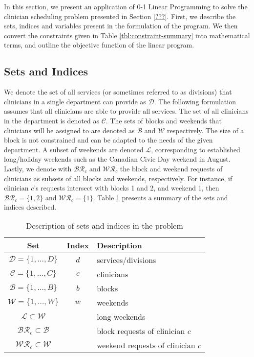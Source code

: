 In this section, we present an application of 0-1 Linear Programming to solve the clinician scheduling problem presented in Section \ref{???}. First, we describe the sets, indices and variables present in the formulation of the program. We then convert the constraints given in Table \ref{tbl:constraint-summary} into mathematical terms, and outline the objective function of the linear program.

\subsection{Sets and Indices}
We denote the set of all services (or sometimes referred to as divisions) %
that clinicians in a single department can provide as $\mathcal{D}$. The following formulation assumes that all clinicians are able to provide all services. The set of all clinicians in the department is denoted as $\mathcal{C}$. The sets of blocks and weekends that clinicians will be assigned to are denoted as $\mathcal{B}$ and $\mathcal{W}$ respectively. The size of a block is not constrained and can be adapted %
to the needs of the given department. A subset of weekends are denoted $\mathcal{L}$, corresponding to established long/holiday weekends such as the Canadian Civic Day weekend in August. Lastly, we denote with $\mathcal{BR}_c$ and $\mathcal{WR}_c$ the block and weekend requests of clinicians as subsets of all blocks and weekends, respectively. For instance, if clinician $c$'s requests intersect with blocks 1 and 2, and weekend 1, then $\mathcal{BR}_c = \{1, 2\}$ and $\mathcal{WR}_c = \{1\}$. Table \ref{tbl:sets-indices} presents a summary of the sets and indices described. 

\begin{table}[h]
	\centering
	\begin{tabular}{ c c l }
		\hline
		\textbf{Set}                         & \textbf{Index} & \textbf{Description}              \\ \hline
		$\mathcal{D} = \{1, \ldots, D \}$    & $d$            & services/divisions                \\
		$\mathcal{C} = \{1, \ldots, C \}$    & $c$            & clinicians                        \\
		$\mathcal{B} = \{1, \ldots, B \}$    & $b$            & blocks                            \\
		$\mathcal{W} = \{1, \ldots, W \}$    & $w$            & weekends                          \\
		$\mathcal{L} \subset \mathcal{W}$    &                & long weekends                     \\
		$\mathcal{BR}_c \subset \mathcal{B}$ &                & block requests of clinician $c$   \\
		$\mathcal{WR}_c \subset \mathcal{W}$ &                & weekend requests of clinician $c$
	\end{tabular}
	\caption{Description of sets and indices in the problem}
	\label{tbl:sets-indices}
\end{table}

